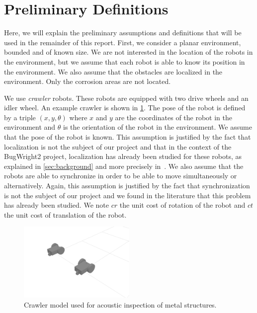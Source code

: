 \section{Preliminary Definitions}\label{sec:definitions}

Here, we will explain the preliminary assumptions and definitions that will be used in the remainder of this report.
First, we consider a planar environment, bounded and of known size.
We are not interested in the location of the robots in the environment, but we assume that each robot is able to know its position in the environment.
We also assume that the obstacles are localized in the environment.
Only the corrosion areas are not located.

We use \textit{crawler} robots. These robots are equipped with two drive wheels and an idler wheel.
An example crawler is shown in \ref{fig:crawler}.
The pose of the robot is defined by a triple $(x, y, \theta)$ where $x$ and $y$ are the coordinates of the robot in the environment and $\theta$ is the orientation of the robot in the environment.
We assume that the pose of the robot is known.
This assumption is justified by the fact that localization is not the subject of our project and that in the context of the BugWright2 project, localization has already been studied for these robots, as explained in \ref{sec:background} and more precisely in~\cite{9364359}.
We also assume that the robots are able to synchronize in order to be able to move simultaneously or alternatively.
Again, this assumption is justified by the fact that synchronization is not the subject of our project and we found in the literature that this problem has already been studied.
We note $cr$ the unit cost of rotation of the robot and $ct$ the unit cost of translation of the robot.

\begin{figure}[h!]
	\centering
	\includegraphics[width=0.5\textwidth]{graphics/crawlers.png}
	\caption{Crawler model used for acoustic inspection of metal structures.}
	\label{fig:crawler}
\end{figure}

